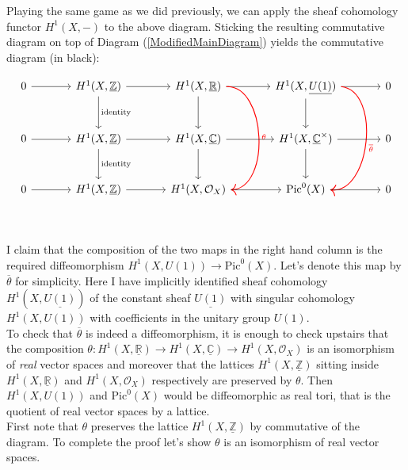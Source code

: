 Playing the same game as we did previously, we can apply the sheaf cohomology functor $H^{1}(X,-)$ to the above diagram. Sticking the resulting commutative diagram on top of Diagram (\ref{ModifiedMainDiagram}) yields the commutative diagram (in black):

\begin{equation}\label{InitialDiagram}
\begin{tikzcd}[sep=large]
0 \arrow[r] & H^{1}(X,\underline{\mathbb{Z}} \arrow[r] \arrow[d, "\textrm{identity}"]) & H^{1}(X,\underline{\mathbb{R}}) \arrow[r] \arrow[d] \arrow[bend left=90, dd, thick, red, "\theta"]  & H^{1}(X,\underline{U(1)}) \arrow[d] \arrow[r] \arrow[bend left=90, dd, red, thick, "\overline{\theta}"] & 0 \\
0 \arrow[r] & H^{1}(X,\underline{\mathbb{Z}} \arrow[r] \arrow[d, "\textrm{identity}"]) & H^{1}(X,\underline{\mathbb{C}}) \arrow[r] \arrow[d]  & H^{1}(X,\underline{\mathbb{C}}^\times) \arrow[d] \arrow[r] & 0 \\
0 \arrow[r] & H^{1}(X,\underline{\mathbb{Z}}) \arrow[r] & H^{1}(X,\mathcal{O}_{X}) \arrow[r] & \textrm{Pic}^{0}(X) \arrow[r] & 0\\
\end{tikzcd}
\end{equation}

I claim that the composition of the two maps in the right hand column is the required diffeomorphism $H^{1}(X,U(1))\rightarrow\textrm{Pic}^{0}(X)$. Let's denote this map by $\overline{\theta}$ for simplicity. Here I have implicitly identified sheaf cohomology $H^{1}(X,\underline{U(1)})$ of the constant sheaf $\underline{U(1)}$ with singular cohomology $H^{1}(X,U(1))$ with coefficients in the unitary group $U(1)$.\\

To check that $\overline{\theta}$ is indeed a diffeomorphism, it is enough to check upstairs that the composition $\theta:H^{1}(X,\underline{\mathbb{R}})\rightarrow H^{1}(X,\underline{\mathbb{C}})\rightarrow H^{1}(X,\mathcal{O}_{X})$ is an isomorphism of \textit{real} vector spaces and moreover that the lattices $H^{1}(X,\underline{\mathbb{Z}})$ sitting inside $H^{1}(X,\underline{\mathbb{R}})$ and $H^{1}(X,\mathcal{O}_{X})$ respectively are preserved by $\theta$. Then $H^{1}(X,U(1))$ and $\textrm{Pic}^{0}(X)$ would be diffeomorphic as real tori, that is the quotient of real vector spaces by a lattice.\\

First note that $\theta$ preserves the lattice $H^{1}(X,\underline{\mathbb{Z}})$ by commutative of the diagram. To complete the proof let's show $\theta$ is an isomorphism of real vector spaces.\\

